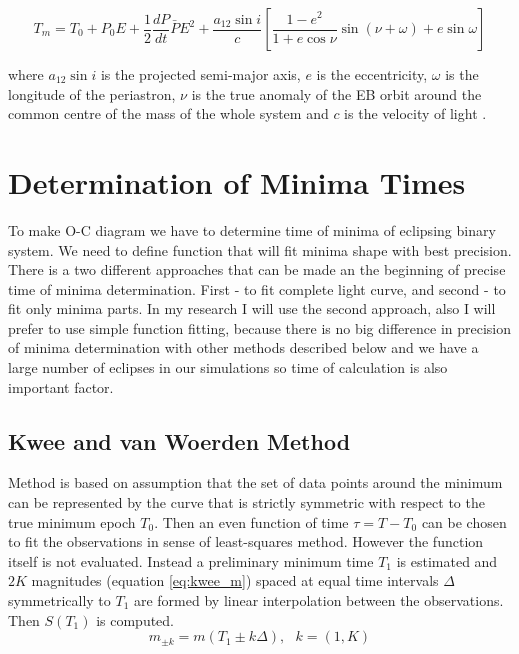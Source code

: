 \begin{equation} \label{eq:P_lin_OC_sin}
T_{m} = T_{0} + P_{0}E + \frac{1}{2} \frac{dP}{dt} \bar{P}E^{2} +
\dfrac{a_{12}\sin i}{c}   \left[  \dfrac{1-e^2}{1+e \cos\nu}   \sin(\nu + \omega)  + e \sin \omega  \right]
\end{equation} 

where $a_{12} \sin i$ is the projected semi-major axis, $e$ is the eccentricity,
$\omega$ is the longitude of the periastron, $\nu$ is the true anomaly of the EB orbit around the common centre of the mass of
the whole system and $c$ is the velocity of light \citep{irwin1952}.

\section{Determination of Minima Times}
\label{sec:methods}
To make O-C diagram we have to determine time of minima of eclipsing binary system. We need to define function that will fit minima shape with best precision.
There is a two different approaches that can be made an the beginning of precise time of minima determination. First - to fit complete light curve, and second - to fit only minima parts. In my research I will use the second approach, also I will prefer to use simple function fitting, because there is no big difference in precision of minima determination with other methods described below and we have a large number of eclipses in our simulations so time of calculation is also important factor. 


\subsection{Kwee and van Woerden Method}
Method is based on assumption that the set of data points around the minimum can be represented by the curve that is strictly 
symmetric with respect to the true minimum epoch $T_{0}$. Then an even function of time $\tau=T-T_{0}$ can be chosen to
fit the observations in sense of least-squares method. However the function itself is not evaluated. Instead a preliminary 
minimum time $T_{1}$ is estimated and $2K$ magnitudes (equation \ref{eq:kwee_m}) spaced at equal time intervals $\Delta$ symmetrically to $T_{1}$ are formed by linear interpolation between the observations.  Then $S(T_{1})$ is computed.
\begin{equation} \label{eq:kwee_m}
m_{\pm k} = m(T_{1}\pm k \Delta), ~~~ k=(1,K)
\end{equation}

